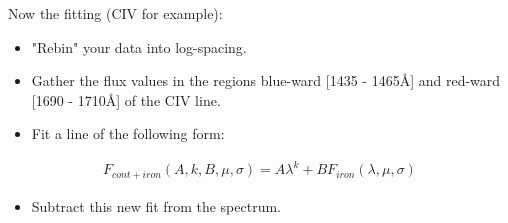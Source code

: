 \documentclass[12pt]{article}
\begin{document}
    Now the fitting (CIV for example):
    \begin{itemize}
        \item "Rebin" your data into log-spacing.
        \item Gather the flux values in the regions blue-ward [1435 - 1465\AA] and red-ward [1690 - 1710\AA] of the CIV line.
        \item Fit a line of the following form:
    \end{itemize}
    \begin{align*}
        F_{cont+iron}(A, k, B, \mu, \sigma) = A \lambda^k + B F_{iron}(\lambda, \mu, \sigma)
    \end{align*}
    \begin{itemize}
        \item Subtract this new fit from the spectrum.
    \end{itemize}
\end{document}
